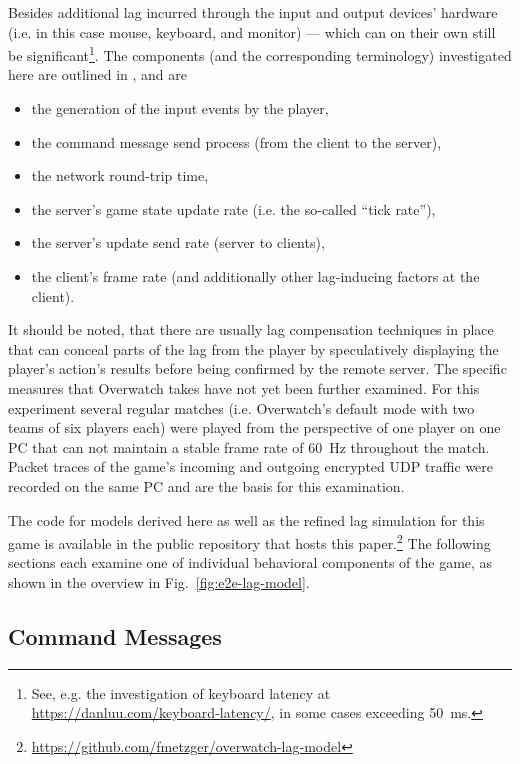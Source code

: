 Besides additional lag incurred through the input and output devices' hardware (i.e. in this case mouse, keyboard, and monitor) --- which can on their own still be significant\footnote{See, e.g. the investigation of keyboard latency at \url{https://danluu.com/keyboard-latency/}, in some cases exceeding \SI{50}{\milli\second}.}. The components (and the corresponding terminology) investigated here are outlined in \cite{Metzger+2016}, and are 
%
\begin{itemize}
	\item the generation of the input events by the player,
	\item the command message send process (from the client to the server),
	\item the network round-trip time,
	\item the server's game state update rate (i.e. the so-called ``tick rate''),
	\item the server's update send rate (server to clients),
	\item the client's frame rate (and additionally other lag-inducing factors at the client).
\end{itemize}
%
It should be noted, that there are usually lag compensation techniques \cite{bernier2001latency} in place that can conceal parts of the lag from the player by speculatively displaying the player's action's results before being confirmed by the remote server. The specific measures that Overwatch takes have not yet been further examined. For this experiment several regular matches (i.e. Overwatch's default mode with two teams of six players each) were played from the perspective of one player on one PC that can not maintain a stable frame rate of \SI{60}{\hertz} throughout the match. Packet traces of the game's incoming and outgoing encrypted UDP traffic were recorded on the same PC and are the basis for this examination. 

The code for models derived here as well as the refined lag simulation for this game is available in the public repository that hosts this paper.\footnote{\url{https://github.com/fmetzger/overwatch-lag-model}}
The following sections each examine one of individual behavioral components of the game, as shown in the overview in Fig.~\ref{fig:e2e-lag-model}.


\subsection{Command Messages}

